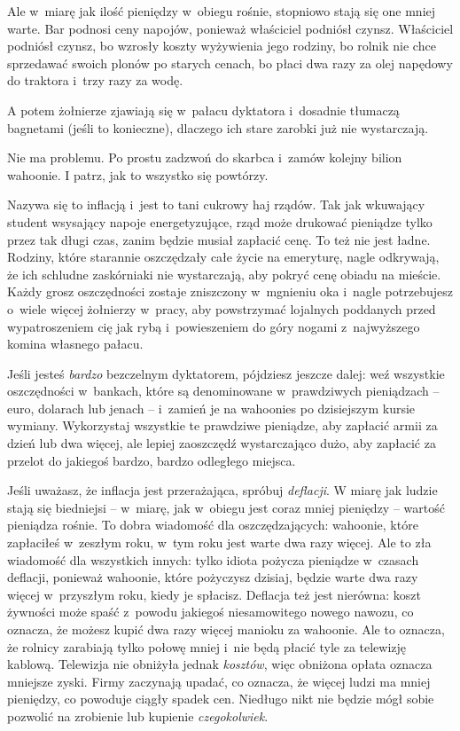 \documentclass[oneside,polish,11pt,rmheadings]{mwbk}
\begin{document}
Ale w~miarę jak ilość pieniędzy w~obiegu rośnie, stopniowo stają się one mniej warte. Bar podnosi ceny napojów, ponieważ właściciel podniósł czynsz. Właściciel podniósł czynsz, bo wzrosły koszty wyżywienia jego rodziny, bo rolnik nie chce sprzedawać swoich plonów po starych cenach, bo płaci dwa razy za olej napędowy do traktora i~trzy razy za wodę.

A potem żołnierze zjawiają się w~pałacu dyktatora i~dosadnie tłumaczą bagnetami (jeśli to konieczne), dlaczego ich stare zarobki już nie wystarczają.

Nie ma problemu. Po prostu zadzwoń do skarbca i~zamów kolejny bilion wahoonie. I patrz, jak to wszystko się powtórzy.

Nazywa się to inflacją i~jest to tani cukrowy haj rządów. Tak jak wkuwający student wsysający napoje energetyzujące, rząd może drukować pieniądze tylko przez tak długi czas, zanim będzie musiał zapłacić cenę. To też nie jest ładne. Rodziny, które starannie oszczędzały całe życie na emeryturę, nagle odkrywają, że ich schludne zaskórniaki nie wystarczają, aby pokryć cenę obiadu na mieście. Każdy grosz oszczędności zostaje zniszczony w~mgnieniu oka i~nagle potrzebujesz o~wiele więcej żołnierzy w~pracy, aby powstrzymać lojalnych poddanych przed wypatroszeniem cię jak rybą i~powieszeniem do góry nogami z~najwyższego komina własnego pałacu.

Jeśli jesteś \textit{bardzo }bezczelnym dyktatorem, pójdziesz jeszcze dalej: weź wszystkie oszczędności w~bankach, które są denominowane w~prawdziwych pieniądzach -- euro, dolarach lub jenach -- i~zamień je na wahoonies po dzisiejszym kursie wymiany. Wykorzystaj wszystkie te prawdziwe pieniądze, aby zapłacić armii za dzień lub dwa więcej, ale lepiej zaoszczędź wystarczająco dużo, aby zapłacić za przelot do jakiegoś bardzo, bardzo odległego miejsca.

Jeśli uważasz, że inflacja jest przerażająca, spróbuj \textit{deflacji}. W miarę jak ludzie stają się biedniejsi -- w~miarę, jak w~obiegu jest coraz mniej pieniędzy -- wartość pieniądza rośnie. To dobra wiadomość dla oszczędzających: wahoonie, które zapłaciłeś w~zeszłym roku, w~tym roku jest warte dwa razy więcej. Ale to zła wiadomość dla wszystkich innych: tylko idiota pożycza pieniądze w~czasach deflacji, ponieważ wahoonie, które pożyczysz dzisiaj, będzie warte dwa razy więcej w~przyszłym roku, kiedy je spłacisz. Deflacja też jest nierówna: koszt żywności może spaść z~powodu jakiegoś niesamowitego nowego nawozu, co oznacza, że możesz kupić dwa razy więcej manioku za wahoonie. Ale to oznacza, że rolnicy zarabiają tylko połowę mniej i~nie będą płacić tyle za telewizję kablową. Telewizja nie obniżyła jednak \textit{kosztów}, więc obniżona opłata oznacza mniejsze zyski. Firmy zaczynają upadać, co oznacza, że więcej ludzi ma mniej pieniędzy, co powoduje ciągły spadek cen. Niedługo nikt nie będzie mógł sobie pozwolić na zrobienie lub kupienie \textit{czegokolwiek}.
\end{document}
